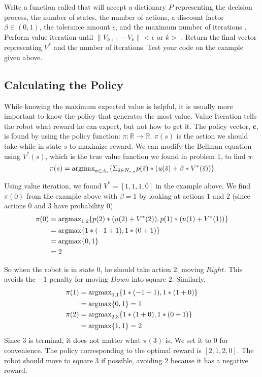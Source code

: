 \begin{problem}
\label{prob:policyiter-value1}
Write a function called  that will accept a dictionary $P$ representing the decision process, the number of states, the number of actions, a discount factor $\beta \in (0,1)$,
the tolerance amount $\epsilon$, and the maximum number of iterations .
Perform value iteration until $\|V_{k+1} - V_{k}\| < \epsilon$ or $k > $ .
Return the final vector representing $V^*$ and the number of iterations.
Test your code on the example given above. 
\end{problem}

\subsection*{Calculating the Policy}

While knowing the maximum expected value is helpful, it is usually more important to know the policy that generates the most value.
Value Iteration tells the robot what reward he can expect, but not how to get it.
The policy vector, $\mathbf{c}$, is found by using the policy function: $\pi : \mathbb{R} \to \mathbb{R}$.
$\pi(s)$ is the action we should take while in state $s$ to maximize reward.
We can modify the Bellman equation using $V^*(s)$, which is the true value function we found in problem $1$, to find $\pi$:
\begin{equation}
\label{eq:policyiter-pol_func}
\pi(s) = \mbox{argmax}_{a \in A_s} \{\Sigma_{\bar{s}\in N_{s,a}} p(\bar{s})*(u(\bar{s}) + \beta*V^*(\bar{s}))\}
\end{equation}

Using value iteration, we found $V^*  = [1, 1, 1, 0]$ in the example above.
We find $\pi(0)$ from the example above with $\beta = 1$ by looking at actions $1$ and $2$ (since actions 0 and 3 have probability 0).
\begin{align*}
\pi(0) &=\mbox{argmax}_{1,2} \{p(2)*(u(2) + V^*(2)), p(1)*(u(1)+V^*(1))\} \\
&= \mbox{argmax} \{1*(-1+1), 1*(0+1)\} \\
&= \mbox{argmax}\{0, 1\}\\
&= 2
\end{align*}

So when the robot is in state $0$, he should take action $2$, moving $Right$.
This avoids the $-1$ penalty for moving $Down$ into square $2$.
Similarly,
\begin{align*}
\pi(1) &= \mbox{argmax}_{0,1} \{1*(-1+1), 1*(1+0)\} \\
&= \mbox{argmax} \{0, 1\} = 1 \\
\pi(2) &= \mbox{argmax}_{2,3} \{1*(1+0), 1*(0+1)\} \\
&= \mbox{argmax} \{1, 1\} = 2
\end{align*}
Since $3$ is terminal, it does not matter what $\pi(3)$ is.
We set it to $0$ for convenience.
The policy corresponding to the optimal reward is $[2,1,2,0]$.
The robot should move to square $3$ if possible, avoiding $2$ because it has a negative reward.

